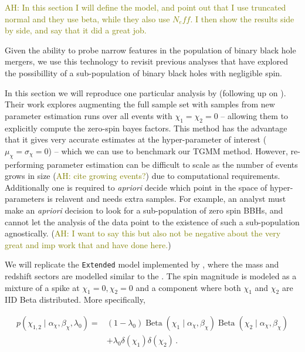 \documentclass[twocolumn,usenames,dvipsnames,linenumbers]{aastex631}
\newcommand{\asad}[1]{\textcolor{olive}{AH: #1}}
\begin{document}
\asad{
	In this section I will define the model, and point out that I use truncated normal and they use beta, while they also use $N_eff$. I then show the results side by side, and say that it did a great job.
}

Given the ability to probe narrow features in the population of binary black hole mergers, we use this technology to revisit previous analyses that have explored the possibillity of a sub-population of binary black holes with negligible spin. 

In this section we will reproduce one particular analysis by \cite{Tong2022} (following up on \cite{Galaudage2021}).  Their work explores augmenting the full sample set with samples from new parameter estimation runs over all events with $\chi_1 = \chi_2 = 0$ -- allowing them to explicitly compute the zero-spin bayes factors. This method has the advantage that it gives very accurate estimates at the hyper-parameter of interest ($\mu_\chi = \sigma_\chi = 0$) -- which we can use to benchmark our TGMM method. However, re-performing parameter estimation can be difficult to scale as the number of events grows in size (\asad{cite growing events?}) due to computational requirements. Additionally one is required to \textit{apriori} decide which point in the space of hyper-parameters is relavent and needs extra samples. For example, an analyst must make an \textit{apriori} decision to look for a sub-population of zero spin BBHs, and cannot let the analysis of the data point to the existence of such a sub-population agnostically. (\asad{I want to say this but also not be negative about the very great and imp work that \cite{Tong2022} and \cite{Galaudage2021} have done here.})

We will replicate the \texttt{Extended} model implemented by \cite{Tong2022}, where the mass and redshift sectors are modelled similar to the \cite{LVKPop}. The spin magnitude is modeled as a mixture of a spike at $\chi_1 = 0, \chi_2 = 0$ and a component where both $\chi_1$ and $\chi_2$ are IID Beta distributed. More specifically, 

\begin{equation}
\begin{aligned}
	p\left(\chi_{1,2} \mid \alpha_\chi, \beta_\chi, \lambda_0\right)= &\left(1-\lambda_0\right) \operatorname{Beta}\left(\chi_1 \mid \alpha_\chi, \beta_\chi\right) \operatorname{Beta}\left(\chi_2 \mid \alpha_\chi, \beta_\chi\right)\\&+\lambda_0 \delta\left(\chi_1\right) \delta\left(\chi_2\right)\,.
\end{aligned}
\end{equation}
\end{document}
